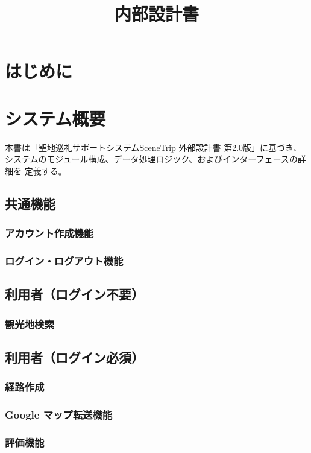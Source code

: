 \documentclass{docs}
\title{内部設計書}
\begin{document}
\section{はじめに}

\section{システム概要}
本書は「聖地巡礼サポートシステムSceneTrip 外部設計書 第2.0版」に基づき、
システムのモジュール構成、データ処理ロジック、およびインターフェースの詳細を
定義する。
\subsection{共通機能}
\subsubsection{アカウント作成機能}

\subsubsection{ログイン・ログアウト機能}

\subsection{利用者（ログイン不要）}
\subsubsection{観光地検索}

\subsection{利用者（ログイン必須）}

\subsubsection{経路作成}

\subsubsection{Google マップ転送機能}

\subsubsection{評価機能}
\end{document}
